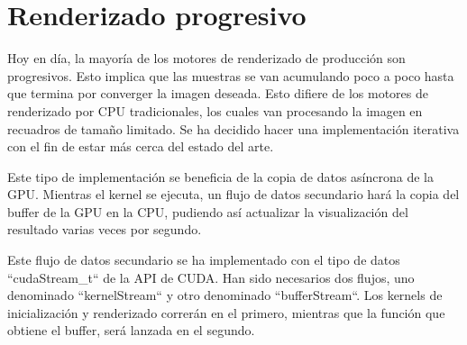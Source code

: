 	
	\section{Renderizado progresivo}
		
	Hoy en día, la mayoría de los motores de renderizado de producción son progresivos. Esto implica que las muestras se van acumulando poco a poco hasta que termina por converger la imagen deseada. Esto difiere de los motores de renderizado por CPU tradicionales, los cuales van procesando la imagen en recuadros de tamaño limitado. Se ha decidido hacer una implementación iterativa con el fin de estar más cerca del estado del arte.



	Este tipo de implementación se beneficia de la copia de datos asíncrona de la GPU. Mientras el kernel se ejecuta, un flujo de datos secundario hará la copia del buffer de la GPU en la CPU, pudiendo así actualizar la visualización del resultado varias veces por segundo.

	Este flujo de datos secundario se ha implementado con el tipo de datos ``cudaStream\_t`` de la API de CUDA. Han sido necesarios dos flujos, uno denominado ``kernelStream`` y otro denominado ``bufferStream``. Los kernels de inicialización y renderizado correrán en el primero, mientras que la función que obtiene el buffer, será lanzada en el segundo.
